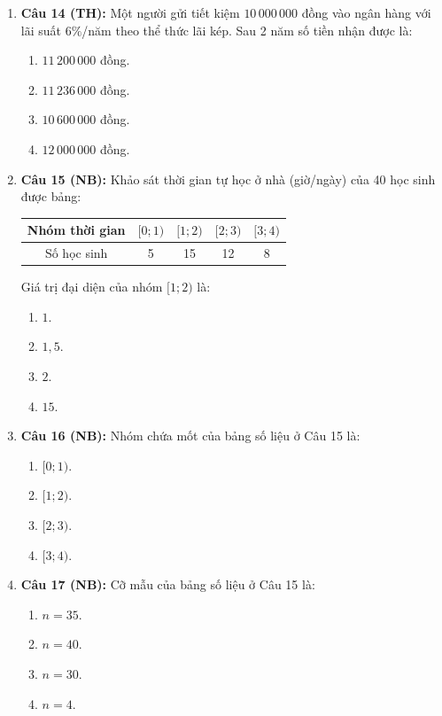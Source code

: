 \documentclass[12pt, a4paper]{article}
\begin{document}
\begin{enumerate}[leftmargin=0.8cm]
    \item \textbf{Câu 14 (TH):} Một người gửi tiết kiệm $10\,000\,000$ đồng vào ngân hàng với lãi suất $6\%$/năm theo thể thức lãi kép. Sau 2 năm số tiền nhận được là:
    \begin{enumerate}[label=\Alph*., leftmargin=0.8cm]
        \item $11\,200\,000$ đồng.
        \item $11\,236\,000$ đồng.
        \item $10\,600\,000$ đồng.
        \item $12\,000\,000$ đồng.
    \end{enumerate}

    \item \textbf{Câu 15 (NB):} Khảo sát thời gian tự học ở nhà (giờ/ngày) của 40 học sinh được bảng:
    \begin{center}
    \small
    \begin{tabular}{|c|c|c|c|c|}
        \hline
        Nhóm thời gian & $[0; 1)$ & $[1; 2)$ & $[2; 3)$ & $[3; 4)$ \\ \hline
        Số học sinh & 5 & 15 & 12 & 8 \\ \hline
    \end{tabular}
    \end{center}
    Giá trị đại diện của nhóm $[1; 2)$ là:
    \begin{enumerate}[label=\Alph*., leftmargin=0.8cm]
        \item $1$.
        \item $1{,}5$.
        \item $2$.
        \item $15$.
    \end{enumerate}

    \item \textbf{Câu 16 (NB):} Nhóm chứa mốt của bảng số liệu ở Câu 15 là:
    \begin{enumerate}[label=\Alph*., leftmargin=0.8cm]
        \item $[0; 1)$.
        \item $[1; 2)$.
        \item $[2; 3)$.
        \item $[3; 4)$.
    \end{enumerate}

    \item \textbf{Câu 17 (NB):} Cỡ mẫu của bảng số liệu ở Câu 15 là:
    \begin{enumerate}[label=\Alph*., leftmargin=0.8cm]
        \item $n = 35$.
        \item $n = 40$.
        \item $n = 30$.
        \item $n = 4$.
    \end{enumerate}


\end{enumerate}
\end{document}
